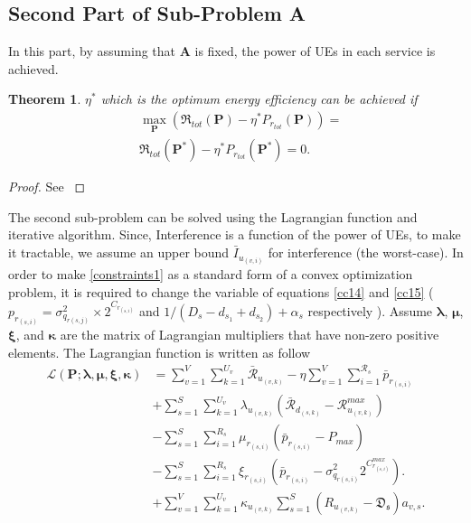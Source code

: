 \documentclass[conference]{IEEEtran}
\newtheorem{theorem}{Theorem}
\begin{document}
\subsection{Second Part of Sub-Problem A}\label{secondsub}
In this part, by assuming that $\boldsymbol{A}$ is fixed, the power of UEs in each service is achieved.
\begin{theorem}\label{t2}
 $\eta^*$ which is the optimum energy efficiency can be achieved if
\begin{equation}\label{q2}
\begin{split}
&\max \limits_{\boldsymbol{P}} (\mathfrak{R}_{tot}(\boldsymbol{P}) - \eta^* P_{r_{tot}}(\boldsymbol{P}))=\\
& \mathfrak{R}_{tot}(\boldsymbol{P}^*) - \eta^* P_{r_{tot}}(\boldsymbol{P}^*) =0.
\end{split}
\end{equation}
\end{theorem}
\begin{proof}
See \cite[Appendix A]{aaa}
\end{proof}
The second sub-problem can  be solved using the Lagrangian function and iterative algorithm.
Since, Interference is a function of the power of UEs, to make it tractable, we assume an upper bound $\bar{I}_{u_{(v,i)}}$ for interference (the worst-case).
In order to make \eqref{constraints1} as a standard form of a convex optimization problem, it is required to change the variable of equations \eqref{cc14} and \eqref{cc15} ($p_{r_{(s,i)}} = \sigma_{q_{r(s,j)}}^2\times 2^{C_{r_{(s,i)}}}$ and $1/(D_{s}- d_{s_1} + d_{s_2})+\alpha_s$ respectively ).
Assume $\boldsymbol{\lambda}$, $\boldsymbol{\mu}$, $\boldsymbol{\xi}$, and $\boldsymbol{ \kappa}$ are the matrix of Lagrangian multipliers that have non-zero positive elements.
The Lagrangian function is written as follow
\begin{equation}\label{lagrang}
\begin{split}
\mathcal{L}(\boldsymbol{P}; \boldsymbol{\lambda}, \boldsymbol{\mu}, \boldsymbol{ \xi}, \boldsymbol{ \kappa}) & = \sum\limits_{v=1}^{V} \sum\limits_{k=1}^{U_v}\mathcal{\bar{R}}_{u_{(v,k)}}
- \eta \sum\limits_{v=1}^{V} \sum\limits_{i=1}^{\mathcal{R}_s}\bar{p}_{r_{(s,i)}}\\
&+\sum\limits_{s=1}^{S} \sum\limits_{k=1}^{U_v} \lambda_{u_{(v,k)}} (\mathcal{\bar{R}}_{d_{(s,k)}}-\mathcal{R}_{u_{(v,k)}}^{max})\\
&- \sum\limits_{s=1}^{S} \sum\limits_{i=1}^{R_s} \mu_{r_{(s,i)}} (\bar{p}_{r_{(s,i)}}-P_{max})\\
&- \sum\limits_{s=1}^{S} \sum\limits_{i=1}^{R_s} \xi_{r_{(s,i)}} (\bar{p}_{r_{(s,i)}}-\sigma_{q_{r(s,i)}}^2 2^{C_{r_{(s,i)}}^{max}}).\\
&+ \sum\limits_{v=1}^{V} \sum\limits_{k=1}^{U_v} \kappa_{u_{(v,k)}} \sum\limits_{s=1}^{S}(R_{u_{(v,k)}} -\mathfrak{D_s})a_{v,s}.\\
\end{split}
\end{equation}
\end{document}
